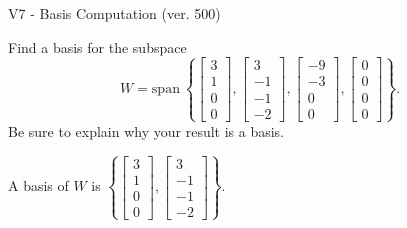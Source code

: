 \begin{exercise}
  \begin{exerciseTitle}V7 - Basis Computation (ver. 500)\end{exerciseTitle}
  \begin{exerciseStatement}
    Find a basis for the subspace 
\[W=\mathrm{span}\ \left\{\left[\begin{array}{r}
3 \\
1 \\
0 \\
0
\end{array}\right] , \left[\begin{array}{r}
3 \\
-1 \\
-1 \\
-2
\end{array}\right] , \left[\begin{array}{r}
-9 \\
-3 \\
0 \\
0
\end{array}\right] , \left[\begin{array}{r}
0 \\
0 \\
0 \\
0
\end{array}\right]\right\}.\]
 Be sure to explain why your result is a basis.


  \end{exerciseStatement}
  \begin{exerciseAnswer}
   A basis of \(W\) is  \(\left\{\left[\begin{array}{r}
3 \\
1 \\
0 \\
0
\end{array}\right] , \left[\begin{array}{r}
3 \\
-1 \\
-1 \\
-2
\end{array}\right]\right\}\).
  


  \end{exerciseAnswer}
\end{exercise}